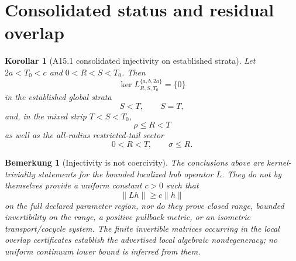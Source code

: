 \documentclass[11pt,a4paper]{amsart}
\newtheorem{corollary}[theorem]{Korollar}
\newtheorem{remark}[theorem]{Bemerkung}
\begin{document}
\section{Consolidated status and residual overlap}\label{sec:p12-status}

\begin{corollary}[A15.1 consolidated injectivity on established strata]
\label{cor:p12-consolidated}
Let \(2a<T_0<c\) and \(0<R<S<T_0\). Then
\[
\ker L_{R,S,T_0}^{\{a,b,2a\}}=\{0\}
\]
in the established global strata
\[
S<T,\qquad S=T,
\]
and, in the mixed strip \(T<S<T_0\),
\[
\rho\le R<T
\]
as well as the all-radius restricted-tail sector
\[
0<R<T,\qquad \sigma\le R.
\]
\end{corollary}

\begin{remark}[Injectivity is not coercivity]
The conclusions above are kernel-triviality statements for the bounded
localized hub operator $L$. They do not by themselves provide a uniform
constant $c>0$ such that
\[
  \|Lh\|\ge c\|h\|
\]
on the full declared parameter region, nor do they prove closed range,
bounded invertibility on the range, a positive pullback metric, or an
isometric transport/cocycle system. The finite invertible matrices occurring
in the local overlap certificates establish the advertised local algebraic
nondegeneracy; no uniform continuum lower bound is inferred from them.
\end{remark}
\end{document}
